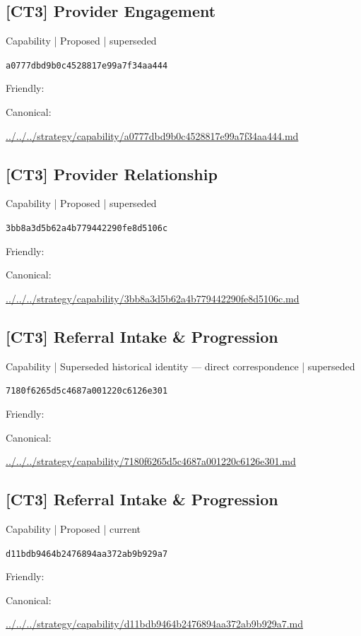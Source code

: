 \documentclass[10pt,a4paper]{article}
\begin{document}
\subsection*{[CT3] Provider Engagement}
{\small Capability | Proposed | superseded}\par
\texttt{a0777dbd9b0c4528817e99a7f34aa444}\par
Friendly: \par
Canonical: \par
{\footnotesize\url{../../../strategy/capability/a0777dbd9b0c4528817e99a7f34aa444.md}}\par
\subsection*{[CT3] Provider Relationship}
{\small Capability | Proposed | superseded}\par
\texttt{3bb8a3d5b62a4b779442290fe8d5106c}\par
Friendly: \par
Canonical: \par
{\footnotesize\url{../../../strategy/capability/3bb8a3d5b62a4b779442290fe8d5106c.md}}\par
\subsection*{[CT3] Referral Intake \& Progression}
{\small Capability | Superseded historical identity — direct correspondence | superseded}\par
\texttt{7180f6265d5c4687a001220c6126e301}\par
Friendly: \par
Canonical: \par
{\footnotesize\url{../../../strategy/capability/7180f6265d5c4687a001220c6126e301.md}}\par
\subsection*{[CT3] Referral Intake \& Progression}
{\small Capability | Proposed | current}\par
\texttt{d11bdb9464b2476894aa372ab9b929a7}\par
Friendly: \par
Canonical: \par
{\footnotesize\url{../../../strategy/capability/d11bdb9464b2476894aa372ab9b929a7.md}}\par
\end{document}
